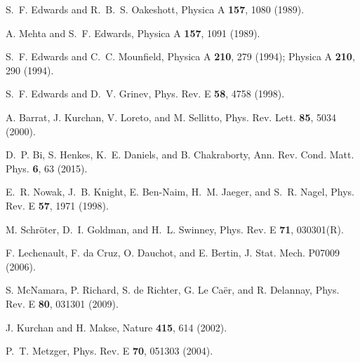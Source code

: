 \documentclass[prl,twocolumn,floats,floatfix,aps,superscriptaddress,showpacs]{revtex4-1}
\begin{document}
\begin{thebibliography}{99}

S.~F. Edwards and R.~B.~S. Oakeshott, Physica A {\bf 157}, 1080 (1989).

A. Mehta and S.~F. Edwards, Physica A {\bf 157}, 1091 (1989).

S.~F. Edwards and C.~C. Mounfield,  Physica A {\bf 210}, 279 (1994);
Physica A {\bf 210}, 290 (1994).

S.~F. Edwards and D.~V. Grinev, Phys. Rev. E {\bf 58}, 4758 (1998).

A. Barrat, J. Kurchan, V. Loreto, and M. Sellitto, Phys. Rev. Lett. {\bf 85}, 5034 (2000). 

D.~P. Bi, S. Henkes, K.~E. Daniels, and B. Chakraborty, Ann. Rev. Cond. Matt. Phys. {\bf 6}, 63 (2015).

E.~R. Nowak, J.~B. Knight, E. Ben-Naim, H.~M. Jaeger, and S.~R. Nagel, Phys. Rev. E {\bf 57}, 1971 (1998).

M. Schr\"oter, D.~I. Goldman, and H.~L. Swinney, Phys. Rev. E {\bf 71}, 030301(R).

F. Lechenault, F. da Cruz, O. Dauchot, and E. Bertin, J. Stat. Mech. P07009 (2006).

S. McNamara, P. Richard, S. de Richter, G. Le Ca\"er, and R. Delannay, Phys. Rev. E {\bf 80}, 031301 (2009).

J. Kurchan and H. Makse, Nature {\bf 415}, 614 (2002).

P.~T. Metzger, Phys. Rev. E {\bf 70}, 051303 (2004).


\end{thebibliography}
\end{document}
